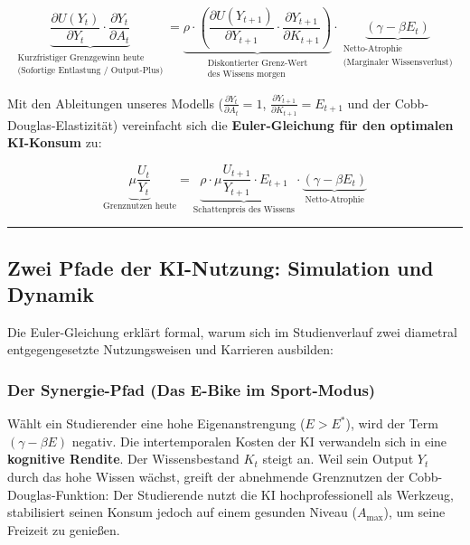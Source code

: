 \documentclass[
  ngerman,
  letterpaper,
  DIV=11]{scrartcl}
\begin{document}
\[\underbrace{\frac{\partial U(Y_t)}{\partial Y_t} \cdot \frac{\partial Y_t}{\partial A_t}}_{\substack{\text{Kurzfristiger Grenzgewinn heute} \\ \text{(Sofortige Entlastung / Output-Plus)}}} = \underbrace{\rho \cdot \left( \frac{\partial U(Y_{t+1})}{\partial Y_{t+1}} \cdot \frac{\partial Y_{t+1}}{\partial K_{t+1}} \right)}_{\substack{\text{Diskontierter Grenz-Wert} \\ \text{des Wissens morgen}}} \cdot \underbrace{(\gamma - \beta E_t)}_{\substack{\text{Netto-Atrophie} \\ \text{(Marginaler Wissensverlust)}}}\]

Mit den Ableitungen unseres Modells
(\(\frac{\partial Y_t}{\partial A_t} = 1\),
\(\frac{\partial Y_{t+1}}{\partial K_{t+1}} = E_{t+1}\) und der
Cobb-Douglas-Elastizität) vereinfacht sich die \textbf{Euler-Gleichung
für den optimalen KI-Konsum} zu:

\[\underbrace{\mu \frac{U_t}{Y_t}}_{\text{Grenznutzen heute}} = \underbrace{\rho \cdot \mu \frac{U_{t+1}}{Y_{t+1}} \cdot E_{t+1}}_{\text{Schattenpreis des Wissens}} \cdot \underbrace{(\gamma - \beta E_t)}_{\text{Netto-Atrophie}}\]

\begin{center}\rule{0.5\linewidth}{0.5pt}\end{center}

\subsection{Zwei Pfade der KI-Nutzung: Simulation und
Dynamik}\label{zwei-pfade-der-ki-nutzung-simulation-und-dynamik}

Die Euler-Gleichung erklärt formal, warum sich im Studienverlauf zwei
diametral entgegengesetzte Nutzungsweisen und Karrieren ausbilden:

\subsubsection{Der Synergie-Pfad (Das E-Bike im
Sport-Modus)}\label{der-synergie-pfad-das-e-bike-im-sport-modus}

Wählt ein Studierender eine hohe Eigenanstrengung (\(E > E^*\)), wird
der Term \((\gamma - \beta E)\) negativ. Die intertemporalen Kosten der
KI verwandeln sich in eine \textbf{kognitive Rendite}. Der
Wissensbestand \(K_t\) steigt an. Weil sein Output \(Y_t\) durch das
hohe Wissen wächst, greift der abnehmende Grenznutzen der
Cobb-Douglas-Funktion: Der Studierende nutzt die KI hochprofessionell
als Werkzeug, stabilisiert seinen Konsum jedoch auf einem gesunden
Niveau (\(A_{\max}\)), um seine Freizeit zu genießen.
\end{document}
